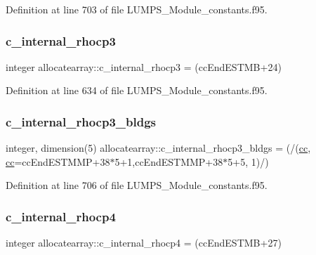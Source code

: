 Definition at line 703 of file L\+U\+M\+P\+S\+\_\+\+Module\+\_\+constants.\+f95.

\mbox{\label{namespaceallocatearray_aab52371de295d084f7c7c2e80eeeafeb}} 
\subsubsection{\texorpdfstring{c\+\_\+internal\+\_\+rhocp3}{c\_internal\_rhocp3}}
{\footnotesize\ttfamily integer allocatearray\+::c\+\_\+internal\+\_\+rhocp3 = (cc\+End\+E\+S\+T\+MB+24)}



Definition at line 634 of file L\+U\+M\+P\+S\+\_\+\+Module\+\_\+constants.\+f95.

\mbox{\label{namespaceallocatearray_acb2bd7717c5f5c616bed1e3e845d7622}} 
\subsubsection{\texorpdfstring{c\+\_\+internal\+\_\+rhocp3\+\_\+bldgs}{c\_internal\_rhocp3\_bldgs}}
{\footnotesize\ttfamily integer, dimension(5) allocatearray\+::c\+\_\+internal\+\_\+rhocp3\+\_\+bldgs = (/(\hyperlink{namespaceallocatearray_ac863c81704eb507dee10f5e10741e10c}{cc}, \hyperlink{namespaceallocatearray_ac863c81704eb507dee10f5e10741e10c}{cc}=cc\+End\+E\+S\+T\+M\+MP+38$\ast$5+1,cc\+End\+E\+S\+T\+M\+MP+38$\ast$5+5, 1)/)}



Definition at line 706 of file L\+U\+M\+P\+S\+\_\+\+Module\+\_\+constants.\+f95.

\mbox{\label{namespaceallocatearray_a1fd0fd9b11afc790bcbd29f2ecab1ba2}} 
\subsubsection{\texorpdfstring{c\+\_\+internal\+\_\+rhocp4}{c\_internal\_rhocp4}}
{\footnotesize\ttfamily integer allocatearray\+::c\+\_\+internal\+\_\+rhocp4 = (cc\+End\+E\+S\+T\+MB+27)}




